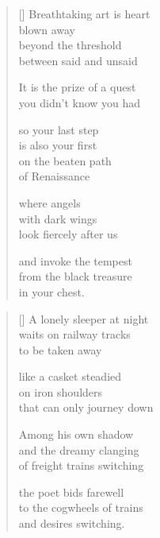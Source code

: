 \documentclass[14pt]{extbook}
\newcommand{\clearemptydoublepage}{\newpage{\pagestyle{empty}\cleardoublepage}}
\newcommand*{\centeredornament}{\centerline{\pgfornament[width=6cm]{88}}}
\begin{document}

\newpage

\vspace*{-15mm}
\centeredornament
\vspace*{-7mm}


\settowidth{\versewidth}{you didn't know you had}

\begin{verse}[\versewidth]
  Breathtaking art is heart \\
  blown away \\
  beyond the threshold \\
  between said and unsaid

  It is the prize of a quest \\
  you didn't know you had

  so your last step \\
  is also your first \\
  on the beaten path \\
  of Renaissance

  where angels \\
  with dark wings \\
  look fiercely after us

  and invoke the tempest \\
  from the black treasure \\
  in your chest.
\end{verse}


\newpage

\vspace*{-15mm}
\centeredornament
\vspace*{-7mm}


\settowidth{\versewidth}{that can only journey down}

\begin{verse}[\versewidth]
  A lonely sleeper at night \\
  waits on railway tracks \\
  to be taken away

  like a casket steadied \\
  on iron shoulders \\
  that can only journey down

  Among his own shadow \\
  and the dreamy clanging \\
  of freight trains switching

  the poet bids farewell \\
  to the cogwheels of trains \\
  and desires switching.
\end{verse}


\thispagestyle{empty} \ \clearemptydoublepage
\thispagestyle{empty} \ \clearemptydoublepage
\end{document}

